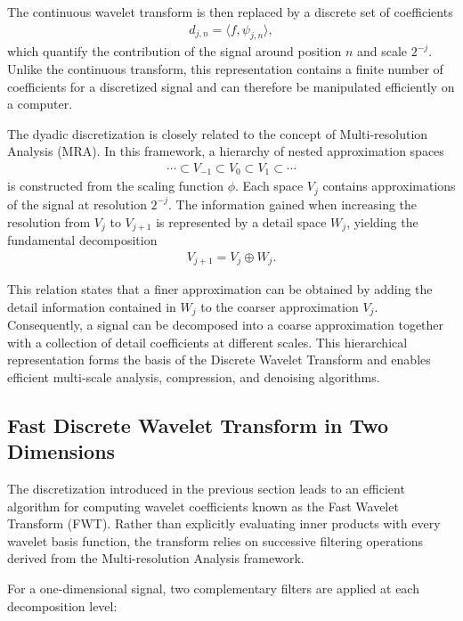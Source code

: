 The continuous wavelet transform is then replaced by a discrete set of coefficients
\begin{align}
d_{j,n}
=
\langle f,\psi_{j,n}\rangle,
\end{align}
which quantify the contribution of the signal around position $n$ and scale $2^{-j}$. Unlike the continuous transform, this representation contains a finite number of coefficients for a discretized signal and can therefore be manipulated efficiently on a computer.

The dyadic discretization is closely related to the concept of Multi-resolution Analysis (MRA). In this framework, a hierarchy of nested approximation spaces
\begin{align}
\cdots \subset V_{-1}
\subset V_0
\subset V_1
\subset \cdots
\end{align}
is constructed from the scaling function $\phi$. Each space $V_j$ contains approximations of the signal at resolution $2^{-j}$. The information gained when increasing the resolution from $V_j$ to $V_{j+1}$ is represented by a detail space $W_j$, yielding the fundamental decomposition
\begin{align}
V_{j+1}
=
V_j \oplus W_j.
\end{align}

This relation states that a finer approximation can be obtained by adding the detail information contained in $W_j$ to the coarser approximation $V_j$. Consequently, a signal can be decomposed into a coarse approximation together with a collection of detail coefficients at different scales. This hierarchical representation forms the basis of the Discrete Wavelet Transform and enables efficient multi-scale analysis, compression, and denoising algorithms.



\subsection{Fast Discrete Wavelet Transform in Two Dimensions}

The discretization introduced in the previous section leads to an efficient algorithm for computing wavelet coefficients known as the Fast Wavelet Transform (FWT). Rather than explicitly evaluating inner products with every wavelet basis function, the transform relies on successive filtering operations derived from the Multi-resolution Analysis framework.

For a one-dimensional signal, two complementary filters are applied at each decomposition level:

